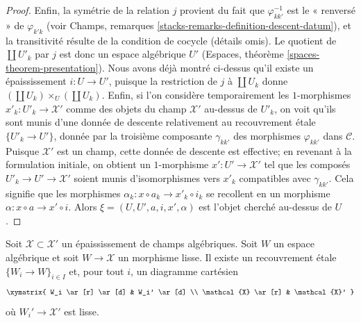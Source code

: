 \begin{proof}
Enfin, la symétrie de la relation $j$ provient du fait que
$\varphi_{kk'}^{-1}$ est le « renversé » de $\varphi_{k'k}$ (voir
Champs, remarques \ref{stacks-remarks-definition-descent-datum}),
et la transitivité résulte de la condition de cocycle (détails omis).
Le quotient de $\coprod U'_k$ par $j$ est donc un espace algébrique $U'$
(Espaces, théorème \ref{spaces-theorem-presentation}).
Nous avons déjà montré ci-dessus qu'il existe un épaississement
$i : U \to U'$, puisque la restriction de $j$ à
$\coprod U_k$ donne $(\coprod U_k) \times_U (\coprod U_k)$.
Enfin, si l'on considère temporairement les $1$-morphismes
$x'_k : U'_k \to \mathcal{X}'$ comme des objets du champ
$\mathcal{X}'$ au-dessus de $U'_k$, on voit qu'ils sont munis d'une
donnée de descente relativement au recouvrement \'etale
$\{U'_k \to U'\}$, donnée par la troisième composante $\gamma_{kk'}$
des morphismes $\varphi_{kk'}$ dans $\mathcal{C}$.
Puisque $\mathcal{X}'$ est un champ,
cette donnée de descente est effective; en revenant à la formulation initiale, on obtient
un $1$-morphisme $x' : U' \to \mathcal{X}'$ tel que les composés
$U'_k \to U' \to \mathcal{X}'$ soient munis d'isomorphismes vers $x'_k$
compatibles avec $\gamma_{kk'}$. Cela signifie que les morphismes
$\alpha_k : x \circ a_k \to x'_k \circ i_k$ se recollent en un morphisme
$\alpha : x \circ a \to x' \circ i$. Alors $\xi = (U, U', a, i, x', \alpha)$
est l'objet cherché au-dessus de $U$.
\end{proof}

\begin{lemma}
\label{lemma-etale-local-lifts}
Soit $\mathcal{X} \subset \mathcal{X}'$ un épaississement de champs algébriques.
Soit $W$ un espace algébrique et soit $W \to \mathcal{X}$ un morphisme lisse.
Il existe un recouvrement \'etale $\{W_i \to W\}_{i \in I}$ et, pour tout $i$,
un diagramme cartésien
$$
\xymatrix{
W_i \ar[r] \ar[d] & W_i' \ar[d] \\
\mathcal{X} \ar[r] & \mathcal{X}'
}
$$
où $W_i' \to \mathcal{X}'$ est lisse.
\end{lemma}

